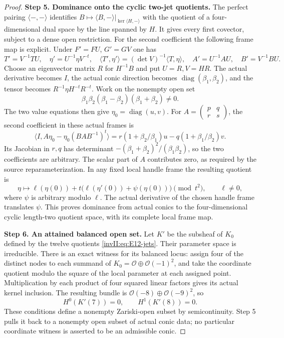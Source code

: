 \begin{proof}
\noindent\textbf{Step 5. Dominance onto the cyclic two-jet quotients.}
The perfect pairing $\langle-,-\rangle$ identifies
$B\mapsto\langle B,-\rangle|_{\ker\langle H,-\rangle}$ with the
quotient of a four-dimensional dual space by the line spanned by
$H$. It gives every first covector, subject to a dense open restriction.
For the second coefficient the following frame map is explicit.
Under $F'=FU$, $G'=GV$ one has
\[
 T'=V^{-1}TU,\quad \eta'=U^{-1}\eta V^{-t},\quad
 \langle T',\eta'\rangle=(\det V)^{-1}\langle T,\eta\rangle,
 \quad A'=U^{-1}AU,\quad B'=V^{-1}BU.
\]
Choose an eigenvector matrix $R$ for $H^{-1}B$ and put $U=R,V=HR$.
The actual derivative becomes $I$, the actual conic direction becomes
$\operatorname{diag}(\beta_1,\beta_2)$, and the tensor becomes
$R^{-1}\eta H^{-t}R^{-t}$. Work on the nonempty open set
\[
 \beta_1\beta_2(\beta_1-\beta_2)(\beta_1+\beta_2)\ne0.
\]
The two value equations then give
$\eta_0=\operatorname{diag}(u,v)$. For
$A=\left(\begin{smallmatrix}p&q\\r&s\end{smallmatrix}\right)$,
the second coefficient in these actual frames is
\[
 \langle I,A\eta_0-\eta_0(BAB^{-1})^t\rangle
   =r(1+\beta_2/\beta_1)u-q(1+\beta_1/\beta_2)v.
\]
Its Jacobian in $r,q$ has determinant
$-(\beta_1+\beta_2)^2/(\beta_1\beta_2)$, so the two coefficients
are arbitrary. The scalar part of $A$ contributes zero, as required
by the source reparameterization.
In any fixed local handle frame the resulting quotient is
\[
 \eta\longmapsto\ell(\eta(0))+
 t\bigl(\ell(\eta'(0))+\psi(\eta(0))\bigr)\pmod{t^2},
 \qquad \ell\ne0,
\]
where $\psi$ is arbitrary modulo $\ell$. The actual derivative of
the chosen handle frame translates $\psi$. This proves dominance
from actual conics to the four-dimensional cyclic length-two
quotient space, with its complete local frame map.

\noindent\textbf{Step 6. An attained balanced open set.}
Let $K'$ be the subsheaf of $K_0$ defined by the twelve quotients
\eqref{invII:eq:E12-jets}. Their parameter space is irreducible.
There is an exact witness for its balanced locus: assign four of
the distinct nodes to each summand of
$K_0=\mathcal O\oplus\mathcal O(-1)^2$, and take the coordinate
quotient modulo the square of the local parameter at each assigned
point. Multiplication by each product of four squared linear
factors gives its actual kernel inclusion. The resulting bundle is
$\mathcal O(-8)\oplus\mathcal O(-9)^2$, so
\[
 H^0(K'(7))=0,\qquad H^1(K'(8))=0.                    \tag{E.12.3}\label{invII:eq:E12-open}
\]
These conditions define a nonempty Zariski-open subset by
semicontinuity. Step 5 pulls it back to a nonempty open subset of
actual conic data; no particular coordinate witness is asserted to
be an admissible conic.


\end{proof}
